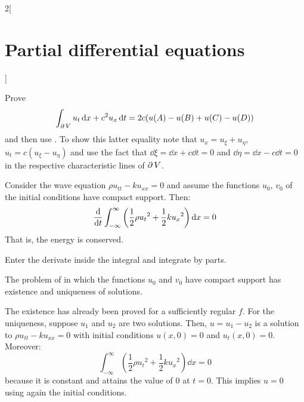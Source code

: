 \documentclass[../../../main_math.tex]{subfiles}
\begin{document}
\begin{multicols}{2}[\section{Partial differential equations}]
  \begin{sproof}
    Prove $$\int_{\operatorname{\partial}{V}}u_t\dd{x}+c^2 u_x\dd{t}=2c(u(A)-u(B)+u(C)-u(D))$$ and then use . To show this latter equality note that $u_x=u_\xi+u_\eta$, $u_t=c(u_\xi-u_\eta)$ and use the fact that $\dd{\xi}=\dd{x}+c\dd{t}=0$ and $\dd{\eta}=\dd{x}-c\dd{t}=0$ in the respective characteristic lines of $\operatorname{\partial}{V}$.
  \end{sproof}
  \begin{center}
    \begin{minipage}{\linewidth}
      \centering
      
      \label{PDE:waves-char}
    \end{minipage}
  \end{center}
  \begin{proposition}
    Consider the wave equation $\rho u_{tt}-ku_{xx}=0$ and assume the functions $u_0$, $v_0$ of the initial conditions have compact support. Then: $$\dv{}{t}\int_{-\infty}^\infty\left(\frac{1}{2}\rho{u_t}^2+\frac{1}{2}k{u_x}^2\right)\dd{x}=0$$ That is, the energy is conserved.
  \end{proposition}
  \begin{sproof}
    Enter the derivate inside the integral and integrate by parts.
  \end{sproof}
  \begin{corollary}
    The problem of  in which the functions $u_0$ and $v_0$ have compact support has existence and uniqueness of solutions.
  \end{corollary}
  \begin{sproof}
    The existence has already been proved for a sufficiently regular $f$. For the uniqueness, suppose $u_1$ and $u_2$ are two solutions. Then, $u=u_1-u_2$ is a solution to $\rho u_{tt}-ku_{xx}=0$ with initial conditions $u(x,0)=0$ and $u_t(x,0)=0$. Moreover: $$\int_{-\infty}^\infty\left(\frac{1}{2}\rho{u_t}^2+\frac{1}{2}k{u_x}^2\right)\dd{x}=0$$ because it is constant and attains the value of 0 at $t=0$. This implies $u=0$ using again the initial conditions.
  \end{sproof}

\end{multicols}
\end{document}
